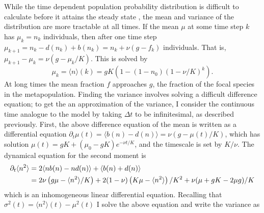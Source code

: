 While the time dependent population probability distribution is difficult to calculate before it attains the steady state \cite{McKane2003}, the mean and variance of the distribution are more tractable at all times. 
If the mean $\mu$ at some time step $k$ has $\mu_k=n_k$ individuals, then after one time step $\mu_{k+1}= n_k - d(n_k) + b(n_k) = n_k + \nu(g-f_k)$ individuals. 
That is, $\mu_{k+1}-\mu_k = \nu(g-\mu_k/K)$. 
This is solved by 
\begin{equation}
 \mu_k = \langle n\rangle(k) = g K \left( 1 - (1-n_0)(1-\nu/K)^k\right).
\end{equation}
At long times the mean fraction $f$ approaches $g$, the fraction of the focal species in the metapopulation. 
Finding the variance involves solving a difficult difference equation; to get the an approximation of the variance, I consider the continuous time analogue to the model by taking $\Delta t$ to be infinitesimal, as described previously. 
First, the above difference equation of the mean is written as a differential equation $\partial_t\mu(t) = \langle b(n)-d(n)\rangle = \nu\left(g-\mu(t)/K\right)$, which has solution $\mu(t) = g K + (\mu_0-g K)e^{-\nu t/K}$, and the timescale is set by $K/\nu$. %
The dynamical equation for the second moment is
\begin{align}
 \partial_t\langle n^2\rangle &= 2\langle n b(n) - n d(n)\rangle + \langle b(n) + d(n)\rangle \\
                              &= 2\nu \left( g \mu - \langle n^2\rangle/K\right) + 2(1-\nu)\left(K\mu-\langle n^2\rangle\right)/K^2 + \nu(\mu + g K - 2 \mu g)/K \notag
\end{align}
which is an inhomogeneous linear differential equation. 
Recalling that $\sigma^2(t) = \langle n^2\rangle(t) - \mu^2(t)$ I solve the above equation and write the variance as
